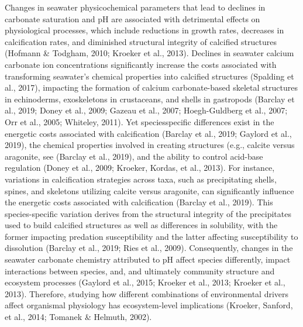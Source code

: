 \documentclass{CSUNthesis}
\begin{document}
Changes in seawater physicochemical parameters that lead to declines in carbonate saturation and pH are associated with detrimental effects on physiological processes, which include reductions in growth rates, decreases in calcification rates, and diminished structural integrity of calcified structures (Hofmann \& Todgham, 2010; Kroeker et al., 2013). Declines in seawater calcium carbonate ion concentrations significantly increase the costs associated with transforming seawater's chemical properties into calcified structures (Spalding et al., 2017), impacting the formation of calcium carbonate-based skeletal structures in echinoderms, exoskeletons in crustaceans, and shells in gastropods (Barclay et al., 2019; Doney et al., 2009; Gazeau et al., 2007; Hoegh-Guldberg et al., 2007; Orr et al., 2005; Whiteley, 2011). Yet speciesspecific differences exist in the energetic costs associated with calcification (Barclay et al., 2019; Gaylord et al., 2019), the chemical properties involved in creating structures (e.g., calcite versus aragonite, see (Barclay et al., 2019), and the ability to control acid-base regulation (Doney et al., 2009; Kroeker, Kordas, et al., 2013). For instance, variations in calcification strategies across taxa, such as precipitating shells, spines, and skeletons utilizing calcite versus aragonite, can significantly influence the energetic costs associated with calcification (Barclay et al., 2019). This species-specific variation derives from the structural integrity of the precipitates used to build calcified structures as well as differences in solubility, with the former impacting predation susceptibility and the latter affecting susceptibility to dissolution (Barclay et al., 2019; Ries et al., 2009). Consequently, changes in the seawater carbonate chemistry attributed to pH affect species differently, impact interactions between species, and, and ultimately community structure and ecosystem processes (Gaylord et al., 2015; Kroeker et al., 2013; Kroeker et al., 2013). Therefore, studying how different combinations of environmental drivers affect organismal physiology has ecosystem-level implications (Kroeker, Sanford, et al., 2014; Tomanek \& Helmuth, 2002).
\end{document}
